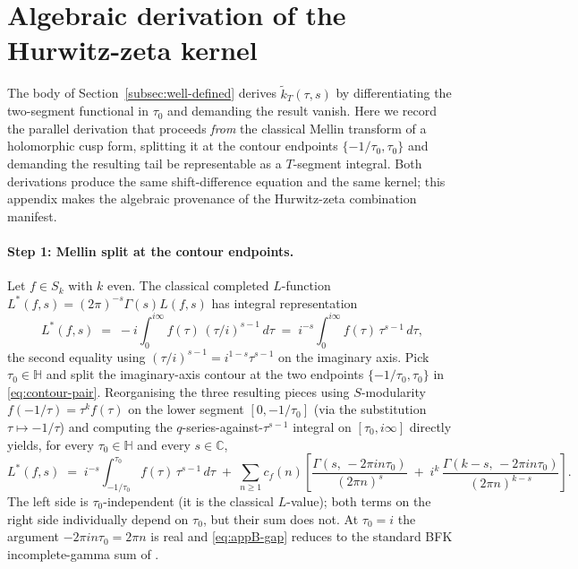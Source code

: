 \documentclass[11pt]{article}
\numberwithin{equation}{section}  %
\newcommand{\HH}{\mathbb{H}}
\newcommand{\CC}{\mathbb{C}}
\begin{document}
\section{Algebraic derivation of the Hurwitz-zeta kernel}\label{app:hurwitz-derivation}

The body of Section~\ref{subsec:well-defined} derives $\widetilde{k}_T(\tau, s)$ by
differentiating the two-segment functional in $\tau_0$ and demanding the
result vanish.  Here we record the parallel derivation that proceeds
\emph{from} the classical Mellin transform of a holomorphic cusp form,
splitting it at the contour endpoints $\{-1/\tau_0, \tau_0\}$ and
demanding the resulting tail be representable as a $T$-segment
integral.  Both derivations produce the same shift-difference equation
and the same kernel; this appendix makes the algebraic provenance of
the Hurwitz-zeta combination manifest.

\paragraph{Step 1: Mellin split at the contour endpoints.}
Let $f \in S_k$ with $k$ even.  The classical completed $L$-function
$L^*(f, s) = (2\pi)^{-s}\Gamma(s) L(f, s)$ has integral representation
\begin{equation}
  L^*(f, s)
  \;=\; -i \int_0^{i\infty}\! f(\tau)\,(\tau/i)^{s-1}\,d\tau
  \;=\; i^{-s}\!\int_0^{i\infty}\! f(\tau)\,\tau^{s-1}\,d\tau,
\end{equation}
the second equality using $(\tau/i)^{s-1} = i^{1-s}\tau^{s-1}$ on the
imaginary axis.  Pick $\tau_0 \in \HH$ and split the imaginary-axis
contour at the two endpoints $\{-1/\tau_0, \tau_0\}$ in
\eqref{eq:contour-pair}.  Reorganising the three resulting pieces
using $S$-modularity $f(-1/\tau) = \tau^k f(\tau)$ on the lower segment
$[0, -1/\tau_0]$ (via the substitution $\tau \mapsto -1/\tau$) and
computing the $q$-series-against-$\tau^{s-1}$ integral on
$[\tau_0, i\infty]$ directly yields, for every $\tau_0 \in \HH$ and
every $s \in \CC$,
\begin{equation}\label{eq:appB-gap}
  L^*(f, s)
  \;=\; i^{-s}\!\int_{-1/\tau_0}^{\tau_0}\! f(\tau)\,\tau^{s-1}\,d\tau
  \;+\; \sum_{n \ge 1} c_f(n)\!
  \left[\frac{\Gamma(s,\,-2\pi i n \tau_0)}{(2\pi n)^s}
  \;+\; i^k\,\frac{\Gamma(k - s,\,-2\pi i n \tau_0)}{(2\pi n)^{k - s}}\right].
\end{equation}
The left side is $\tau_0$-independent (it is the classical $L$-value);
both terms on the right side individually depend on $\tau_0$, but
their sum does not.  At $\tau_0 = i$ the argument $-2\pi i n \tau_0 =
2\pi n$ is real and \eqref{eq:appB-gap} reduces to the standard BFK
incomplete-gamma sum of \cite{BFK2011}.
\end{document}
